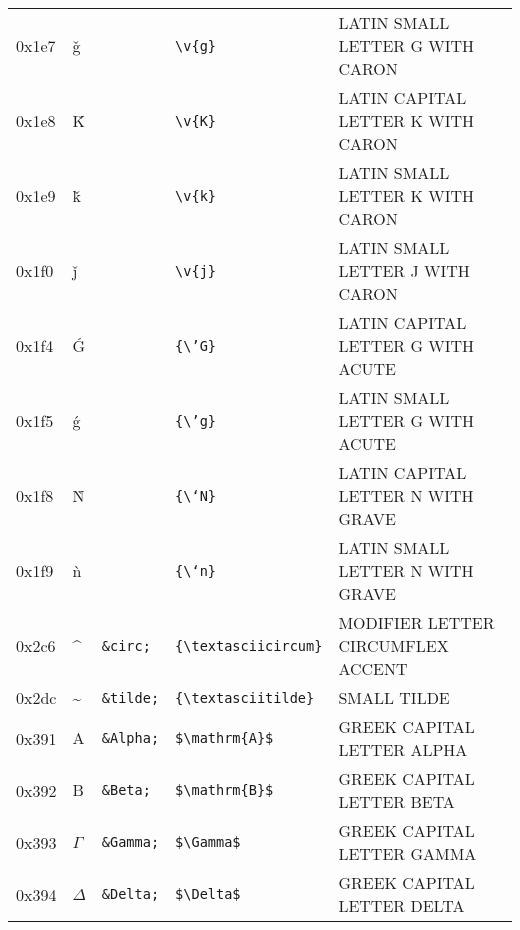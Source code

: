 \documentclass[a4paper,10pt]{article}
\begin{document}
{\begin{center}
\begin{xtabular}{llllp{10cm}}
0x1e7  & \v{g}                  & \texttt{}           & \texttt{{\textbackslash}v\{g\}}                        & LATIN SMALL LETTER G WITH CARON            \\
0x1e8  & \v{K}                  & \texttt{}           & \texttt{{\textbackslash}v\{K\}}                        & LATIN CAPITAL LETTER K WITH CARON          \\
0x1e9  & \v{k}                  & \texttt{}           & \texttt{{\textbackslash}v\{k\}}                        & LATIN SMALL LETTER K WITH CARON            \\
0x1f0  & \v{j}                  & \texttt{}           & \texttt{{\textbackslash}v\{j\}}                        & LATIN SMALL LETTER J WITH CARON            \\
0x1f4  & {\'G}                  & \texttt{}           & \texttt{\{{\textbackslash}'G\}}                        & LATIN CAPITAL LETTER G WITH ACUTE          \\
0x1f5  & {\'g}                  & \texttt{}           & \texttt{\{{\textbackslash}'g\}}                        & LATIN SMALL LETTER G WITH ACUTE            \\
0x1f8  & {\`N}                  & \texttt{}           & \texttt{\{{\textbackslash}`N\}}                        & LATIN CAPITAL LETTER N WITH GRAVE          \\
0x1f9  & {\`n}                  & \texttt{}           & \texttt{\{{\textbackslash}`n\}}                        & LATIN SMALL LETTER N WITH GRAVE            \\
0x2c6  & {\textasciicircum}     & \texttt{\&circ;}    & \texttt{\{{\textbackslash}textasciicircum\}}           & MODIFIER LETTER CIRCUMFLEX ACCENT          \\
0x2dc  & {\textasciitilde}      & \texttt{\&tilde;}   & \texttt{\{{\textbackslash}textasciitilde\}}            & SMALL TILDE                                \\
0x391  & $\mathrm{A}$           & \texttt{\&Alpha;}   & \texttt{\${\textbackslash}mathrm\{A\}\$}               & GREEK CAPITAL LETTER ALPHA                 \\
0x392  & $\mathrm{B}$           & \texttt{\&Beta;}    & \texttt{\${\textbackslash}mathrm\{B\}\$}               & GREEK CAPITAL LETTER BETA                  \\
0x393  & $\Gamma$               & \texttt{\&Gamma;}   & \texttt{\${\textbackslash}Gamma\$}                     & GREEK CAPITAL LETTER GAMMA                 \\
0x394  & $\Delta$               & \texttt{\&Delta;}   & \texttt{\${\textbackslash}Delta\$}                     & GREEK CAPITAL LETTER DELTA                 \\

\end{xtabular}
\end{center}}
\end{document}

